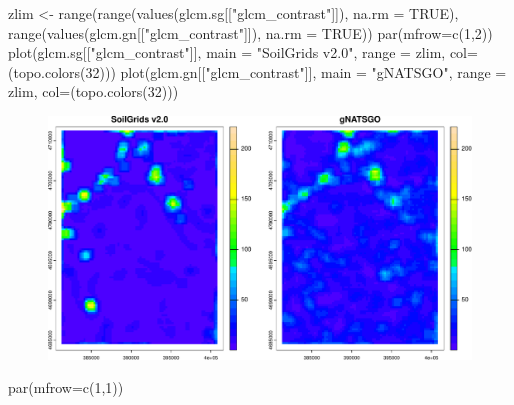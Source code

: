 \documentclass[
  letterpaper,
  DIV=11,
  numbers=noendperiod]{scrartcl}
\newenvironment{Shaded}{\begin{snugshade}}{\end{snugshade}}
\newcommand{\AttributeTok}[1]{\textcolor[rgb]{0.40,0.45,0.13}{#1}}
\newcommand{\ConstantTok}[1]{\textcolor[rgb]{0.56,0.35,0.01}{#1}}
\newcommand{\DecValTok}[1]{\textcolor[rgb]{0.68,0.00,0.00}{#1}}
\newcommand{\FunctionTok}[1]{\textcolor[rgb]{0.28,0.35,0.67}{#1}}
\newcommand{\NormalTok}[1]{\textcolor[rgb]{0.00,0.23,0.31}{#1}}
\newcommand{\OtherTok}[1]{\textcolor[rgb]{0.00,0.23,0.31}{#1}}
\newcommand{\StringTok}[1]{\textcolor[rgb]{0.13,0.47,0.30}{#1}}
\begin{document}
\begin{Shaded}
\begin{Highlighting}[]
\NormalTok{zlim }\OtherTok{\textless{}{-}} \FunctionTok{range}\NormalTok{(}\FunctionTok{range}\NormalTok{(}\FunctionTok{values}\NormalTok{(glcm.sg[[}\StringTok{"glcm\_contrast"}\NormalTok{]]), }\AttributeTok{na.rm =} \ConstantTok{TRUE}\NormalTok{), }
                     \FunctionTok{range}\NormalTok{(}\FunctionTok{values}\NormalTok{(glcm.gn[[}\StringTok{"glcm\_contrast"}\NormalTok{]]), }\AttributeTok{na.rm =} \ConstantTok{TRUE}\NormalTok{))}
\FunctionTok{par}\NormalTok{(}\AttributeTok{mfrow=}\FunctionTok{c}\NormalTok{(}\DecValTok{1}\NormalTok{,}\DecValTok{2}\NormalTok{))}
\FunctionTok{plot}\NormalTok{(glcm.sg[[}\StringTok{"glcm\_contrast"}\NormalTok{]], }\AttributeTok{main =} \StringTok{"SoilGrids v2.0"}\NormalTok{, }
     \AttributeTok{range =}\NormalTok{ zlim, }\AttributeTok{col=}\NormalTok{(}\FunctionTok{topo.colors}\NormalTok{(}\DecValTok{32}\NormalTok{)))}
\FunctionTok{plot}\NormalTok{(glcm.gn[[}\StringTok{"glcm\_contrast"}\NormalTok{]], }\AttributeTok{main =} \StringTok{"gNATSGO"}\NormalTok{, }
     \AttributeTok{range =}\NormalTok{ zlim, }\AttributeTok{col=}\NormalTok{(}\FunctionTok{topo.colors}\NormalTok{(}\DecValTok{32}\NormalTok{)))}
\end{Highlighting}
\end{Shaded}

\begin{figure}[H]

{\centering \includegraphics{PatternAnalysisWorkshopTutorial_files/figure-pdf/unnamed-chunk-23-1.pdf}

}

\end{figure}

\begin{Shaded}
\begin{Highlighting}[]
\FunctionTok{par}\NormalTok{(}\AttributeTok{mfrow=}\FunctionTok{c}\NormalTok{(}\DecValTok{1}\NormalTok{,}\DecValTok{1}\NormalTok{))}
\end{Highlighting}
\end{Shaded}
\end{document}

